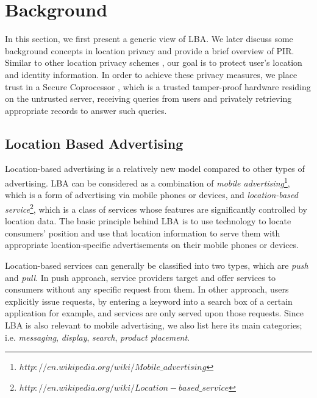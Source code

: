 \section{Background}
\label{sec:background}
\newtheorem{defi}{Definition}


In this section, we first present a generic view of LBA. We later discuss some background concepts in location privacy and provide a brief overview of PIR. Similar to other location privacy schemes \cite{Spiral, No_Need_Anonymizer, Space_Transformation}, our goal is to protect user's location and identity information. In order to achieve these privacy measures, we place trust in a Secure Coprocessor \cite{PIR_SC_Origin}, which is a trusted tamper-proof hardware residing on the untrusted server, receiving queries from users and privately retrieving appropriate records to answer such queries. 


\subsection{Location Based Advertising}
Location-based advertising is a relatively new model compared to other types of advertising. LBA can be considered as a combination of \textit{mobile advertising}\footnote{$http://en.wikipedia.org/wiki/Mobile\_advertising$}, which is a form of advertising via mobile phones or devices, and \textit{location-based service}\footnote{$http://en.wikipedia.org/wiki/Location-based\_service$}, which is a class of services whose features are significantly controlled by location data. The basic principle behind LBA is to use technology to locate consumers' position and use that location information to serve them with appropriate location-specific advertisements on their mobile phones or devices.

Location-based services can generally be classified into two types, which are \textit{push} and \textit{pull}. In push approach, service providers target and offer services to consumers without any specific request from them. In other approach, users explicitly issue requests, by entering a keyword into a search box of a certain application for example, and services are only served upon those requests. Since LBA is also relevant to mobile advertising, we also list here its main categories; i.e. \textit{messaging}, \textit{display}, \textit{search}, \textit{product placement}.

